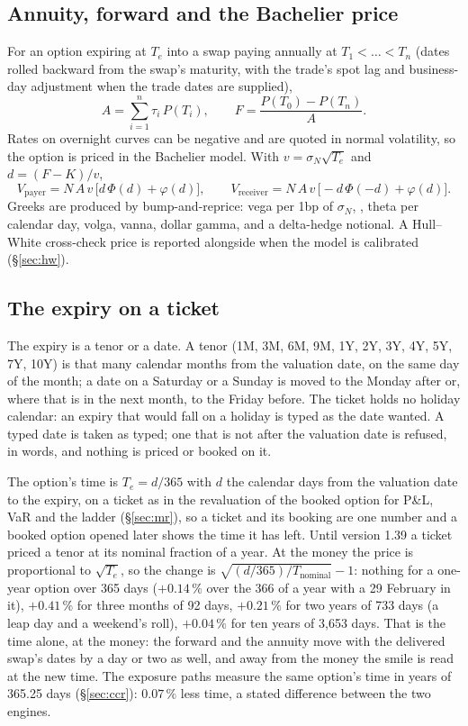 \documentclass[11pt,a4paper]{article}
\newcommand{\code}[1]{\ifmmode\text{\small\texttt{\detokenize{#1}}}\else{\small\path{#1}}\fi}
\let\plainsubsection\subsection
\renewcommand{\subsection}{\needspace{5\baselineskip}\plainsubsection}
\begin{document}
\subsection{Annuity, forward and the Bachelier price}
For an option expiring at $T_e$ into a swap paying annually at $T_1<\dots<T_n$ (dates rolled backward from the swap's maturity, with the trade's spot lag and business-day adjustment when the trade dates are supplied),
\begin{equation}
A = \sum_{i=1}^{n}\tau_i\,P(T_i), \qquad F = \frac{P(T_0)-P(T_n)}{A}.
\end{equation}
Rates on overnight curves can be negative and are quoted in normal volatility, so the option is priced in the Bachelier model. With $v=\sigma_N\sqrt{T_e}$ and $d=(F-K)/v$,
\begin{equation}
V_{\mathrm{payer}} = N\,A\,v\,\big[d\,\Phi(d)+\varphi(d)\big], \qquad
V_{\mathrm{receiver}} = N\,A\,v\,\big[-d\,\Phi(-d)+\varphi(d)\big].
\label{eq:bachelier}
\end{equation}
Greeks are produced by bump-and-reprice: vega per 1bp of $\sigma_N$, \code{IR01}, theta per calendar day, volga, vanna, dollar gamma, and a delta-hedge notional. A Hull--White cross-check price is reported alongside when the model is calibrated (\S\ref{sec:hw}).

\subsection{The expiry on a ticket}\label{sec:swpn-expiry}
The expiry is a tenor or a date. A tenor (1M, 3M, 6M, 9M, 1Y, 2Y, 3Y, 4Y, 5Y, 7Y, 10Y) is that many calendar months from the valuation date, on the same day of the month; a date on a Saturday or a Sunday is moved to the Monday after or, where that is in the next month, to the Friday before. The ticket holds no holiday calendar: an expiry that would fall on a holiday is typed as the date wanted. A typed date is taken as typed; one that is not after the valuation date is refused, in words, and nothing is priced or booked on it.

The option's time is $T_e=d/365$ with $d$ the calendar days from the valuation date to the expiry, on a ticket as in the revaluation of the booked option for P\&L, VaR and the ladder (\S\ref{sec:mr}), so a ticket and its booking are one number and a booked option opened later shows the time it has left. Until version 1.39 a ticket priced a tenor at its nominal fraction of a year. At the money the price is proportional to $\sqrt{T_e}$, so the change is $\sqrt{(d/365)/T_{\text{nominal}}}-1$: nothing for a one-year option over 365 days ($+0.14\,\%$ over the 366 of a year with a 29 February in it), $+0.41\,\%$ for three months of 92 days, $+0.21\,\%$ for two years of 733 days (a leap day and a weekend's roll), $+0.04\,\%$ for ten years of 3{,}653 days. That is the time alone, at the money: the forward and the annuity move with the delivered swap's dates by a day or two as well, and away from the money the smile is read at the new time. The exposure paths measure the same option's time in years of 365.25 days (\S\ref{sec:ccr}): $0.07\,\%$ less time, a stated difference between the two engines.
\end{document}
